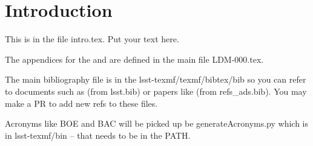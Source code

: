 \section{Introduction} \label{sec:intro}
This is in the file intro.tex. Put your text here.

The appendices for the  and  are defined in the main file LDM-000.tex.

The main bibliography file is in the lsst-texmf/texmf/bibtex/bib so you can refer to documents such as  (from lsst.bib)  or papers like \cite{2008arXiv0805.2366I} (from refs\_ads.bib). You may make a PR to add new refs to these files.

Acronyms like BOE and BAC will be picked up be generateAcronyms.py which is in lsst-texmf/bin -- that needs to be in the PATH.
